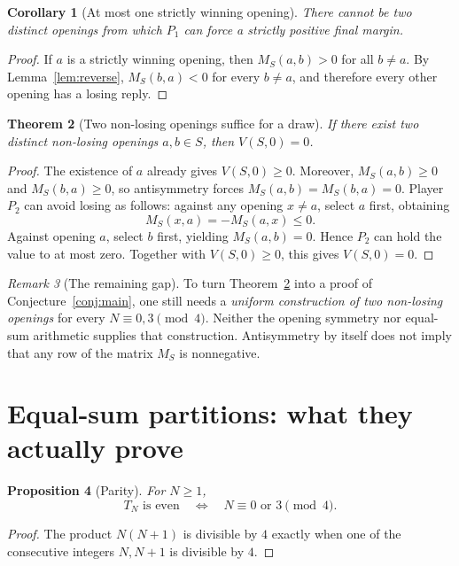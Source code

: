 \documentclass[11pt,a4paper]{article}
\newtheorem{theorem}{Theorem}[section]
\newtheorem{proposition}[theorem]{Proposition}
\newtheorem{corollary}[theorem]{Corollary}
\theoremstyle{definition}
\theoremstyle{remark}
\newtheorem{remark}[theorem]{Remark}
\newcommand{\TN}{T_N}
\begin{document}
\begin{corollary}[At most one strictly winning opening]
\label{cor:unique}
There cannot be two distinct openings from which $P_1$ can force a
strictly positive final margin.
\end{corollary}
\begin{proof}
If $a$ is a strictly winning opening, then $M_S(a,b)>0$ for
all $b\ne a$.  By Lemma~\ref{lem:reverse}, $M_S(b,a)<0$ for every
$b\ne a$, and therefore every other opening has a losing reply.
\end{proof}

\begin{theorem}[Two non-losing openings suffice for a draw]
\label{thm:twoopen}
If there exist two distinct non-losing openings $a,b\in S$, then
$V(S,0)=0$.
\end{theorem}
\begin{proof}
The existence of $a$ already gives $V(S,0)\ge0$.  Moreover,
$M_S(a,b)\ge0$ and $M_S(b,a)\ge0$, so antisymmetry forces
$M_S(a,b)=M_S(b,a)=0$.  Player $P_2$ can avoid losing as follows:
against any opening $x\ne a$, select $a$ first, obtaining
\[
M_S(x,a)=-M_S(a,x)\le0.
\]
Against opening $a$, select $b$ first, yielding $M_S(a,b)=0$.
Hence $P_2$ can hold the value to at most zero.  Together with
$V(S,0)\ge0$, this gives $V(S,0)=0$.
\end{proof}

\begin{remark}[The remaining gap]
To turn Theorem~\ref{thm:twoopen} into a proof of
Conjecture~\ref{conj:main}, one still needs a \emph{uniform
construction of two non-losing openings} for every $N\equiv0,3
\pmod4$.  Neither the opening symmetry nor equal-sum arithmetic
supplies that construction.  Antisymmetry by itself does not imply
that any row of the matrix $M_S$ is nonnegative.
\end{remark}

\section{Equal-sum partitions: what they actually prove}

\begin{proposition}[Parity]
\label{prop:parity}
For $N\ge1$,
\[
\TN\text{ is even}\quad\Longleftrightarrow\quad
N\equiv0\text{ or }3\pmod4.
\]
\end{proposition}
\begin{proof}
The product $N(N+1)$ is divisible by $4$ exactly when one of the
consecutive integers $N,N+1$ is divisible by $4$.
\end{proof}
\end{document}
